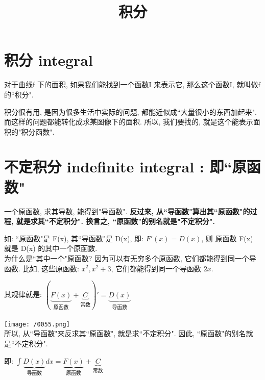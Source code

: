 \documentclass[UTF8]{ctexart}
\title{积分}
\begin{document}
	\tableofcontents %
	\date{} %
	\maketitle  %
	
	\part{积分 integral}
	
	对于曲线f 下的面积, 如果我们能找到一个函数I 来表示它, 那么这个函数I, 就叫做f的``积分".
	
	积分很有用, 是因为很多生活中实际的问题, 都能近似成``大量很小的东西加起来". 而这样的问题都能转化成求某图像下的面积. 所以, 我们要找的, 就是这个能表示面积的"积分函数".
	
	
	
	
	
	
	\part{不定积分 indefinite integral : 即``原函数"}
	
	一个原函数, 求其导数, 能得到"导函数". \textbf{反过来, 从``导函数"算出其``原函数"的过程, 就是求其``不定积分". 换言之, ``原函数"的别名就是"不定积分".}
	
	如: ``原函数"是 F(x), 其``导函数"是 D(x), 即: $ F'(x) = D(x)$, 则  原函数 F(x) 就是 D(x) 的其中一个原函数. \\
	
	为什么是``其中一个"原函数? 因为可以有无穷多个原函数, 它们都能得到同一个导函数. 比如, 这些原函数: $x^2,  x^2+3$, 它们都能得到同一个导函数 $2x$.
	
	其规律就是: $\left( \underset{\text{原函数}}{\underbrace{F\left( x \right) }}+\underset{\text{常数}}{\underbrace{C}} \right) '=\underset{\text{导函数}}{\underbrace{D\left( x \right) }} $ \\
	\\
	
	\texttt{[image: /0055.png]} \\
	
	所以, 从``导函数"来反求其``原函数", 就是求``不定积分". 因此, ``原函数"的别名就是``不定积分".
	
	即: $\int_{}^{}{\underset{\text{导函数}}{\underbrace{D\left( x \right) }}dx=\underset{\text{原函数}}{\underbrace{F\left( x \right) }}+\underset{\text{常数}}{\underbrace{C}}} $ \\
	
\end{document}
